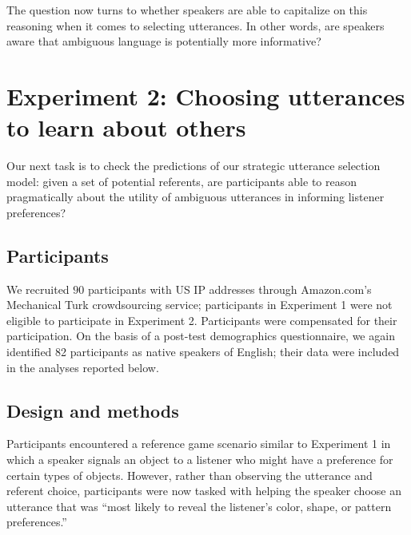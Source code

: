 \documentclass[10pt,a4paper]{article}
\begin{document}
The question now turns to whether speakers are able to capitalize on this reasoning when it comes to selecting utterances. In other words, are speakers aware that ambiguous language is potentially more informative?





\section{Experiment 2: Choosing utterances to learn about others}

Our next task is to check the predictions of our strategic utterance selection model: given a set of potential referents, are participants able to reason pragmatically about the utility of ambiguous utterances in informing listener preferences?

\subsection{Participants}

We recruited $90$ participants with US IP addresses through Amazon.com's Mechanical Turk crowdsourcing service; participants in Experiment 1 were not eligible to participate in Experiment 2. Participants were compensated for their participation. On the basis of a post-test demographics questionnaire, we again identified  82 participants as native speakers of English; their data were included in the analyses reported below.

\subsection{Design and methods}

Participants encountered a reference game scenario similar to Experiment 1 in which a speaker signals an object to a listener who might have a preference for certain types of objects. However, rather than observing the utterance and referent choice, participants were now tasked with helping the speaker choose an utterance that was ``most likely to reveal the listener's color, shape, or pattern preferences.''
\end{document}
